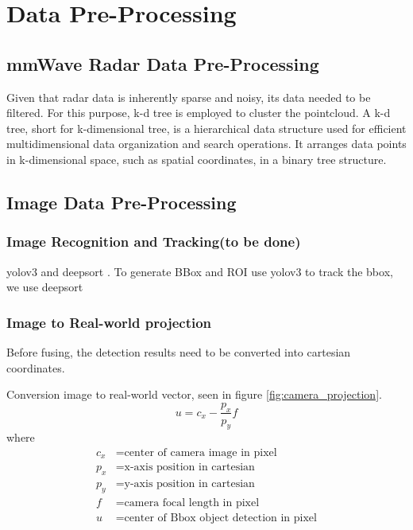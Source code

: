 \section{Data Pre-Processing}\label{sec:2-preprocessing}
\subsection{mmWave Radar Data Pre-Processing}\label{sec:2-kd_tree}
Given that radar data is inherently sparse and noisy, its data needed to be filtered.
For this purpose, k-d tree is employed to cluster the pointcloud.
A k-d tree, short for k-dimensional tree, is a hierarchical data structure used for efficient multidimensional data organization and search operations. 
It arranges data points in k-dimensional space, such as spatial coordinates, in a binary tree structure. 

\subsection{Image Data Pre-Processing}\label{sec:2-img_recognition}
\subsubsection{Image Recognition and Tracking\small(to be done)}
yolov3 \cite{redmon2018yolov3} and deepsort \cite{Wojke2017simple}.
To generate BBox and ROI use yolov3
to track the bbox, we use deepsort 
\subsubsection{Image to Real-world projection}
Before fusing, the detection results need to be converted into cartesian coordinates.

Conversion image to real-world vector, seen in figure \ref{fig:camera_projection}.
\begin{equation}\label{equ:img2cart}
u=c_x-\frac{p_x}{p_y}f
\end{equation}
where
\begin{align*}
    c_x &=\text{center of camera image in pixel}\\
    p_x &=\text{x-axis position in cartesian}\\
    p_y &=\text{y-axis position in cartesian}\\
    f &=\text{camera focal length in pixel}\\
    u &=\text{center of Bbox object detection in pixel}
\end{align*}


